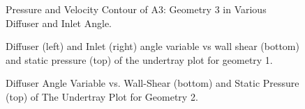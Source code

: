 \begin{figure}
    \noindent{}
    \caption{Pressure and Velocity Contour of A3: Geometry 3 in Various Diffuser and Inlet Angle.}
    \label{fig:2D_OF_A3_Contour1}
\end{figure}



\begin{figure}
    \noindent{}
    \caption{Diffuser (left) and Inlet (right) angle variable vs wall shear (bottom) and static pressure (top) of the undertray plot for geometry 1.}
    \label{fig:2D_OF_A1_PLOT}
\end{figure}

\begin{figure}
    \noindent{}
    \caption{Diffuser Angle Variable vs. Wall-Shear (bottom) and Static Pressure (top) of The Undertray Plot for Geometry 2.}
    \label{fig:2D_OF_A2_PLOT}
\end{figure}


